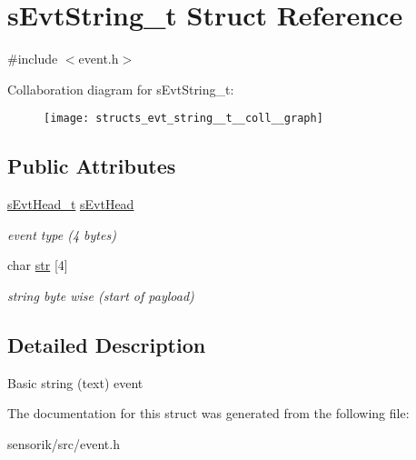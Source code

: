 \hypertarget{structs_evt_string__t}{}\section{s\+Evt\+String\+\_\+t Struct Reference}
\label{structs_evt_string__t}


{\ttfamily \#include $<$event.\+h$>$}



Collaboration diagram for s\+Evt\+String\+\_\+t\+:\nopagebreak
\begin{figure}[H]
\begin{center}
\leavevmode
\texttt{[image: structs\_evt\_string\_\_t\_\_coll\_\_graph]}
\end{center}
\end{figure}
\subsection*{Public Attributes}
\begin{DoxyCompactItemize}
\item 
\mbox{\label{structs_evt_string__t_acfe494f06356d282b210598ccb08599c}} 
\mbox{\hyperlink{structs_evt_head__t}{s\+Evt\+Head\+\_\+t}} \mbox{\hyperlink{structs_evt_string__t_acfe494f06356d282b210598ccb08599c}{s\+Evt\+Head}}
\begin{DoxyCompactList}\small\item\em event type (4 bytes) \end{DoxyCompactList}\item 
\mbox{\label{structs_evt_string__t_ac466f402cbba7d0650c581964f786294}} 
char \mbox{\hyperlink{structs_evt_string__t_ac466f402cbba7d0650c581964f786294}{str}} \mbox{[}4\mbox{]}
\begin{DoxyCompactList}\small\item\em string byte wise (start of payload) \end{DoxyCompactList}\end{DoxyCompactItemize}


\subsection{Detailed Description}
Basic string (text) event 

The documentation for this struct was generated from the following file\+:\begin{DoxyCompactItemize}
\item 
sensorik/src/event.\+h\end{DoxyCompactItemize}

